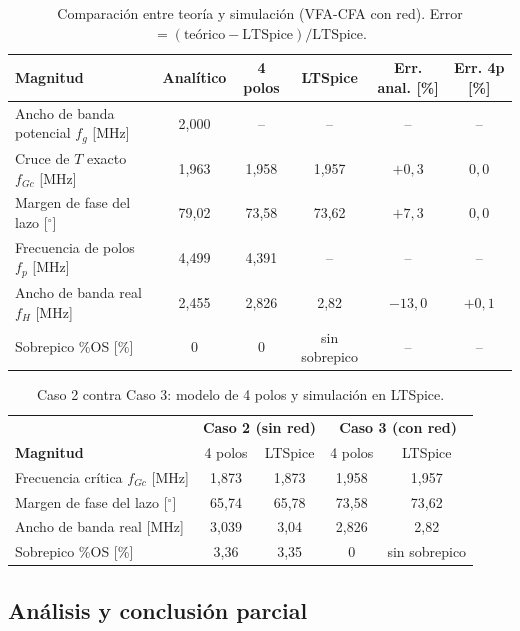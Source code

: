 \begin{table}[H]
\centering
\caption{Comparación entre teoría y simulación (VFA-CFA con red). Error $= (\text{teórico}-\text{LTSpice})/\text{LTSpice}$.}
\label{tab:final_c3}
\small
\setlength{\tabcolsep}{4pt}
\setlength{\tabcolsep}{4pt}
\begin{tabularx}{\textwidth}{>{\raggedright\arraybackslash}X c c c c c}
\toprule
\textbf{Magnitud} & \textbf{Analítico} & \textbf{4 polos} & \textbf{LTSpice} & \textbf{Err. anal. [\%]} & \textbf{Err. 4p [\%]} \\
\midrule
Ancho de banda potencial $f_g$ [MHz] & 2,000 & -- & -- & -- & -- \\
Cruce de $T$ exacto $f_{Gc}$ [MHz] & 1,963 & 1,958 & 1,957 & $+0{,}3$ & $0{,}0$ \\
Margen de fase del lazo [$^\circ$] & 79,02 & 73,58 & 73,62 & $+7{,}3$ & $0{,}0$ \\
Frecuencia de polos $f_p$ [MHz] & 4,499 & 4,391 & -- & -- & -- \\
Ancho de banda real $f_H$ [MHz] & 2,455 & 2,826 & 2,82 & $-13{,}0$ & $+0{,}1$ \\
Sobrepico \%OS [\%] & 0 & 0 & sin sobrepico & -- & -- \\
\bottomrule
\end{tabularx}
\end{table}

\begin{table}[H]
\centering
\caption{Caso 2 contra Caso 3: modelo de 4 polos y simulación en LTSpice.}
\label{tab:comp_sim_c3}
\small
\setlength{\tabcolsep}{4pt}
\begin{tabular}{lcccc}
\toprule
 & \multicolumn{2}{c}{\textbf{Caso 2 (sin red)}} & \multicolumn{2}{c}{\textbf{Caso 3 (con red)}} \\
\textbf{Magnitud} & 4 polos & LTSpice & 4 polos & LTSpice \\
\midrule
Frecuencia crítica $f_{Gc}$ [MHz] & 1,873 & 1,873 & 1,958 & 1,957 \\
Margen de fase del lazo [$^\circ$] & 65,74 & 65,78 & 73,58 & 73,62 \\
Ancho de banda real [MHz] & 3,039 & 3,04 & 2,826 & 2,82 \\
Sobrepico \%OS [\%] & 3,36 & 3,35 & 0 & sin sobrepico \\
\bottomrule
\end{tabular}
\end{table}

\subsection{Análisis y conclusión parcial}
\label{sec:concl_c3}

